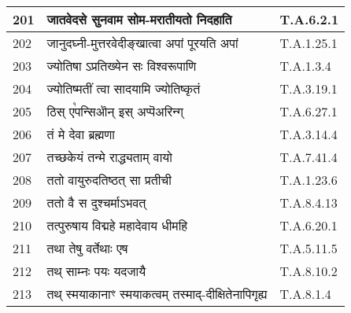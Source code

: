 \documentclass[17pt]{extarticle}
\begin{document}
\begin{longtable}{||p{0.4in}||p{4.9in}||p{0.9in}||}
    \hline
        
    201 & जातवेदसे सुनवाम सोम{-}मरातीयतो निदहाति & T.A.6.2.1       \\
    
    \hline
        
    202 & जानुदघ्नी{-}मुत्तरवेदीङ्खात्वा अपां पूरयति अपां & T.A.1.25.1       \\
    
    \hline
        
    203 & ज्योतिषा ऽप्रतिख्येन सः विश्वरूपाणि & T.A.1.3.4       \\
    
    \hline
        
    204 & ज्योतिष्मतीं त्वा सादयामि ज्योतिष्कृतं & T.A.3.19.1       \\
    
    \hline
        
    205 & ठिस् ए꣡पन्सिऒन् इस् अप्पॆअरिन्ग् & T.A.6.27.1       \\
    
    \hline
        
    206 & तं मे देवा ब्रह्मणा & T.A.3.14.4       \\
    
    \hline
        
    207 & तच्छकेयं तन्मे राद्ध्यताम् वायो & T.A.7.41.4       \\
    
    \hline
        
    208 & ततो वायुरुदतिष्ठत् सा प्रतीची & T.A.1.23.6       \\
    
    \hline
        
    209 & ततो वै स दुश्चर्माऽभवत् & T.A.8.4.13       \\
    
    \hline
        
    210 & तत्पुरुषाय विद्महे महादेवाय धीमहि & T.A.6.20.1       \\
    
    \hline
        
    211 & तथा तेषु वर्तेथाः एष & T.A.5.11.5       \\
    
    \hline
        
    212 & तथ् साम्नः पयः यदजायै & T.A.8.10.2       \\
    
    \hline
        
    213 & तथ् स्मयाकानाꣳ स्मयाकत्वम् तस्माद्{-}दीक्षितेनापिगृह्य & T.A.8.1.4       \\
    

\end{longtable}
\end{document}
